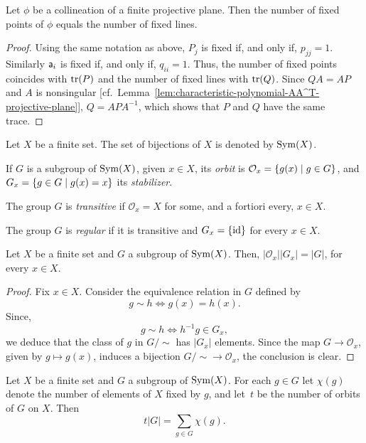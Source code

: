 \begin{cor}\label{cor:fixed-points-equals-fixed-lines}
    Let\/ $\phi$ be a collineation of a finite projective plane. Then the number of fixed points of\/ $\phi$ equals the number of fixed lines.
\end{cor}

\begin{proof}
    Using the same notation as above, $P_j$ is fixed if, and only if, $p_{jj}=1$. Similarly $\mathsf a_i$ is fixed if, and only if, $q_{ii}=1$. Thus, the number of fixed points coincides with $\operatorname{tr}(P)$ and the number of fixed lines with $\operatorname{tr}(Q)$. Since $QA=AP$ and $A$ is nonsingular [cf.~Lemma~\ref{lem:characteristic-polynomial-AA^T-projective-plane}], $Q=APA^{-1}$, which shows that $P$ and $Q$ have the same trace.
    
\end{proof}

\begin{ntn}
    Let\/ $X$ be a finite set. The set of bijections of\/ $X$ is denoted by\/ ${\rm Sym}(X)$.
    
    If\/ $G$ is a subgroup of\/ ${\rm Sym}(X)$, given\/ $x\in X$, its \textsl{orbit} is\/ $\mathcal O_x=\{g(x)\mid g\in G\}$, and\/ $G_x=\{g\in G\mid g(x)=x\}$ its \textsl{stabilizer}.

    The group\/ $G$ is \textsl{transitive} if\/ $\mathcal O_x=X$ for some, and a fortiori every, $x\in X$.

    The group\/ $G$ is \textsl{regular} if it is transitive and\/ $G_x=\{\operatorname{id}\}$ for every\/ $x\in X$.
\end{ntn}

\begin{lem}\label{lem:fundamental-counting-principle}
    Let\/ $X$ be a finite set and\/ $G$ a subgroup of\/ ${\rm Sym}(X)$. Then, $|\mathcal O_x||G_x|=|G|$, for every\/ $x\in X$.
\end{lem}

\begin{proof}\citep[Fundamental Counting Principle]{LC-Groups}
    Fix $x\in X$. Consider the equivalence relation in $G$ defined by
    $$
        g\sim h\iff g(x)=h(x).
    $$
    Since,
    $$
        g\sim h\iff h^{-1}g\in G_x,
    $$
    we deduce that the class of $g$ in $G/{\sim}$ has $|G_x|$ elements. Since the map $G\to\mathcal O_x$, given by $g\mapsto g(x)$, induces a bijection $G/{\sim}\to\mathcal O_x$, the conclusion is clear.
\end{proof}

\begin{thm}\label{thm:number-of-orbits}
    Let\/ $X$ be a finite set and $G$ a subgroup of\/ ${\rm Sym}(X)$. For each\/ $g\in G$ let\/ $\chi(g)$ denote the number of elements of\/ $X$ fixed by\/ $g$, and let\/~$t$ be the number of orbits of\/ $G$ on\/ $X$. Then
    \[
        t|G| = \sum_{g\in G}\chi(g).
    \]
\end{thm}

